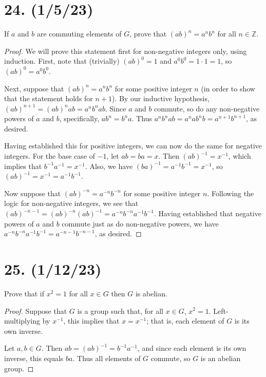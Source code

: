 \documentclass{article}
\begin{document}
\section*{24. (1/5/23)}

If $a$ and $b$ are commuting elements of $G$, prove that $(ab)^n = a^n b^n$ for all $n \in \mathbb{Z}$.

\begin{proof}
      We will prove this statement first for non-negative integers only, using induction. First, note that (trivially) $(ab)^0 = 1$ and $a^0 b^0 = 1 \cdot 1 = 1$, so $(ab)^0 = a^0 b^0$.

      Next, suppose that $(ab)^n = a^n b^n$ for some positive integer $n$ (in order to show that the statement holds for $n + 1$). By our inductive hypothesis, $(ab)^{n + 1} = (ab)^n ab = a^n b^n ab$. Since $a$ and $b$ commute, so do any non-negative powers of $a$ and $b$, specifically, $ab^n = b^n a$. Thus $a^n b^n ab = a^n a b^n b = a^{n + 1} b^{n + 1}$, as desired.

      Having established this for positive integers, we can now do the same for negative integers. For the base case of $-1$, let $ab = ba = x$. Then $(ab)^{-1} = x^{-1}$, which implies that $b^{-1} a^{-1} = x^{-1}$. Also, we have $(ba)^{-1} = a^{-1} b^{-1} = x^{-1}$, so $(ab)^{-1} = x^{-1} = a^{-1} b^{-1}$.

      Now suppose that $(ab)^{-n} = a^{-n} b^{-n}$ for some positive integer $n$. Following the logic for non-negative integers, we see that $(ab)^{-n - 1} = (ab)^{-n} (ab)^{-1} = a^{-n} b^{-n} a^{-1} b^{-1}$. Having established that negative powers of $a$ and $b$ commute just as do non-negative powers, we have $a^{-n} b^{-n} a^{-1} b^{-1} = a^{-n - 1} b^{-n - 1}$, as desired.
\end{proof}

\section*{25. (1/12/23)}

Prove that if $x^2 = 1$ for all $x \in G$ then $G$ is abelian.

\begin{proof}

      Suppose that $G$ is a group such that, for all $x \in G$, $x^2 = 1$. Left-multiplying by $x^{-1}$, this implies that $x = x^{-1}$; that is, each element of $G$ is its own inverse.

      Let $a, b \in G$. Then $ab = (ab)^{-1} = b^{-1} a^{-1}$, and since each element is its own inverse, this equals $ba$. Thus all elements of $G$ commute, so $G$ is an abelian group.
\end{proof}
\end{document}
